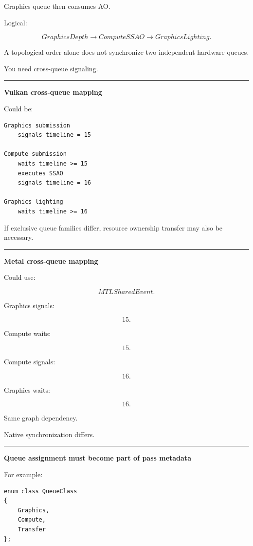 Graphics queue then consumes AO.

Logical:

\[
GraphicsDepth
\rightarrow
ComputeSSAO
\rightarrow
GraphicsLighting.
\]

A topological order alone does not synchronize two independent hardware queues.

You need cross-queue signaling.

\begin{center}\rule{0.5\linewidth}{0.5pt}\end{center}

\textbf{Vulkan cross-queue mapping}

Could be:

\begin{verbatim}
Graphics submission
    signals timeline = 15

Compute submission
    waits timeline >= 15
    executes SSAO
    signals timeline = 16

Graphics lighting
    waits timeline >= 16
\end{verbatim}

If exclusive queue families differ, resource ownership transfer may also be necessary.

\begin{center}\rule{0.5\linewidth}{0.5pt}\end{center}

\textbf{Metal cross-queue mapping}

Could use:

\[
MTLSharedEvent.
\]

Graphics signals:

\[
15.
\]

Compute waits:

\[
15.
\]

Compute signals:

\[
16.
\]

Graphics waits:

\[
16.
\]

Same graph dependency.

Native synchronization differs.

\begin{center}\rule{0.5\linewidth}{0.5pt}\end{center}

\textbf{Queue assignment must become part of pass metadata}

For example:

\begin{verbatim}
enum class QueueClass
{
    Graphics,
    Compute,
    Transfer
};
\end{verbatim}

